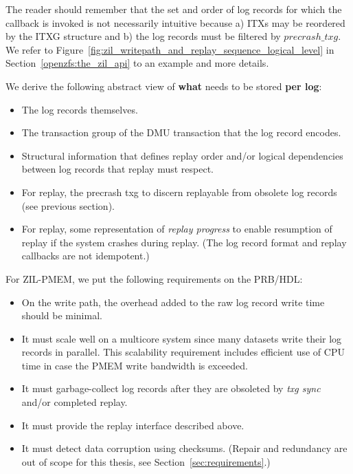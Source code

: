 \documentclass[12pt,a4paper,twoside]{book}
\begin{document}
The reader should remember that the set and order of log records for which the callback is invoked is not necessarily intuitive because
a) ITXs may be reordered by the ITXG structure and b) the log records must be filtered by $precrash\_txg$.
We refer to Figure~\ref{fig:zil_writepath_and_replay_sequence_logical_level} in Section~\ref{openzfs:the_zil_api} to an example and more details.


We derive the following abstract view of \textbf{what} needs to be stored \textbf{per log}:
\begin{itemize}[noitemsep,beginpenalty=100000,midpenalty=100000]
    \item The log records themselves.
    \item The transaction group of the DMU transaction that the log record encodes.
    \item Structural information that defines replay order and/or logical dependencies between log records that replay must respect.
    \item For replay, the precrash txg to discern replayable from obsolete log records (see previous section).
    \item For replay, some representation of \textit{replay progress} to enable resumption of replay if the system crashes during replay.
        (The log record format and replay callbacks are not idempotent.)
\end{itemize}

For ZIL-PMEM, we put the following requirements on the PRB/HDL:
\begin{itemize}[noitemsep,beginpenalty=100000,midpenalty=100000]
    \item On the write path, the overhead added to the raw log record write time should be minimal.
    \item It must scale well on a multicore system since many datasets write their log records in parallel.
        This scalability requirement includes efficient use of CPU time in case the PMEM write bandwidth is exceeded.
    \item It must garbage-collect log records after they are obsoleted by \textit{txg sync} and/or completed replay.
    \item It must provide the replay interface described above.
    \item It must detect data corruption using checksums. (Repair and redundancy are out of scope for this thesis, see Section~\ref{sec:requirements}.)
\end{itemize}
\end{document}
